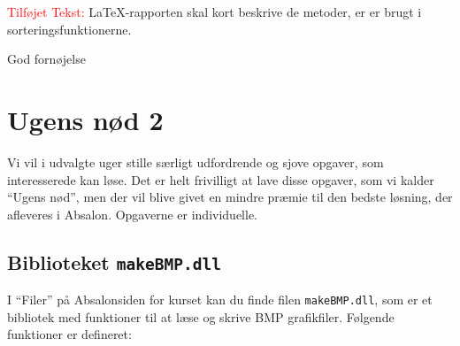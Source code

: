 \documentclass[a4paper]{article}
\begin{document}
\textcolor{red}{Tilføjet Tekst:} \LaTeX-rapporten skal kort beskrive de
metoder, er er brugt i sorteringsfunktionerne.

\vspace{1ex}

\hfill God fornøjelse

\newpage
\section*{Ugens nød 2}

Vi vil i udvalgte uger stille særligt udfordrende og sjove opgaver,
som interesserede kan løse.  Det er helt frivilligt at lave disse
opgaver, som vi kalder ``Ugens nød'', men der vil blive givet en
mindre præmie til den bedste løsning, der afleveres i Absalon.
Opgaverne er individuelle.

\subsection*{Biblioteket \texttt{makeBMP.dll}}

I ``Filer'' på Absalonsiden for kurset kan du finde filen
\texttt{makeBMP.dll}, som er et bibliotek med funktioner til at læse
og skrive BMP grafikfiler.  Følgende funktioner er defineret:
\end{document}
